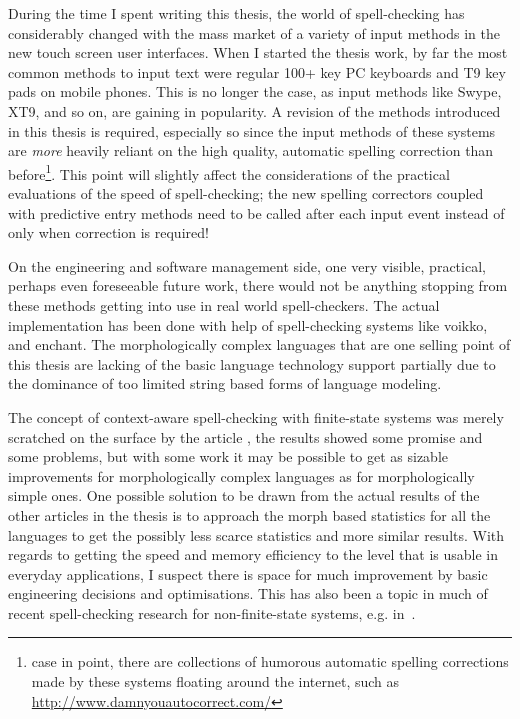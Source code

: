 \documentclass[officiallayout]{unihelcompling}
\begin{document}
During the time I spent writing this thesis, the world of spell-checking has
considerably changed with the mass market of a variety of input methods in the
new touch screen user interfaces. When I started the thesis work, by far the
most common methods to input text were regular 100+ key PC keyboards and T9 key
pads on mobile phones. This is no longer the case, as input methods like Swype,
XT9, and so on, are gaining in popularity. A revision of the methods introduced
in this thesis is required, especially so since the input methods of these
systems are \emph{more} heavily reliant on the high quality, automatic spelling
correction than before\footnote{case in point, there are collections of
    humorous automatic spelling corrections made by these systems floating
around the internet, such as \url{http://www.damnyouautocorrect.com/}}. This
point will slightly affect the considerations of the practical evaluations of
the speed of spell-checking; the new spelling correctors coupled with
predictive entry methods need to be called after each input event instead of
only when correction is required!

On the engineering and software management side, one very visible, practical,
perhaps even foreseeable future work, there would not be anything stopping from
these methods getting into use in real world spell-checkers. The actual
implementation has been done with help of spell-checking systems like voikko,
and enchant. The morphologically complex languages that are one selling point
of this thesis are lacking of the basic language technology support partially
due to the dominance of too limited string based forms of language modeling.

The concept of context-aware spell-checking with finite-state systems was
merely scratched on the surface by the article
, the results showed some promise and some
problems, but with some work it may be possible to get as sizable improvements
for morphologically complex languages as for morphologically simple ones. One
possible solution to be drawn from the actual results of the other articles in
the thesis is to approach the morph based statistics for all the languages to
get the possibly less scarce statistics and more similar results. With regards
to getting the speed and memory efficiency to the level that is usable in
everyday applications, I suspect there is space for much improvement by basic
engineering decisions and optimisations. This has also been a topic in much of
recent spell-checking research for non-finite-state systems, e.g.
in~\citep{carlson2001scaling}.
\end{document}
